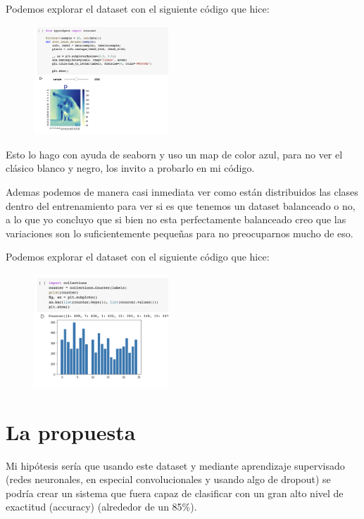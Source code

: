 \documentclass[12pt, fleqn]{report}                             %
\theoremstyle{break}                                            %
\begin{document}
        \clearpage

        Podemos explorar el dataset con el siguiente código que hice:
        \begin{figure}[ht!]
            \includegraphics[width=0.45\textwidth]{see}
        \end{figure}

        Esto lo hago con ayuda de seaborn y uso un map de color azul, para no ver el clásico blanco y negro, los invito
        a probarlo en mi código.
        
        Ademas podemos de manera casi inmediata ver como están distribuidos las clases dentro del entrenamiento para ver
        si es que tenemos un dataset balanceado o no, a lo que yo concluyo que si bien no esta perfectamente balanceado
        creo que las variaciones son lo suficientemente pequeñas para no preocuparnos mucho de eso.
        
        Podemos explorar el dataset con el siguiente código que hice:
        \begin{figure}[ht!]
            \includegraphics[width=0.45\textwidth]{dist}
        \end{figure}


    \chapter{La propuesta}
        Mi hipótesis sería que usando este dataset y
        mediante aprendizaje supervisado (redes neuronales, en especial convolucionales y usando algo de dropout) se podría
        crear un sistema que fuera capaz de clasificar con un gran alto nivel de exactitud (accuracy) (alrededor de un 85\%).
        
\end{document}
